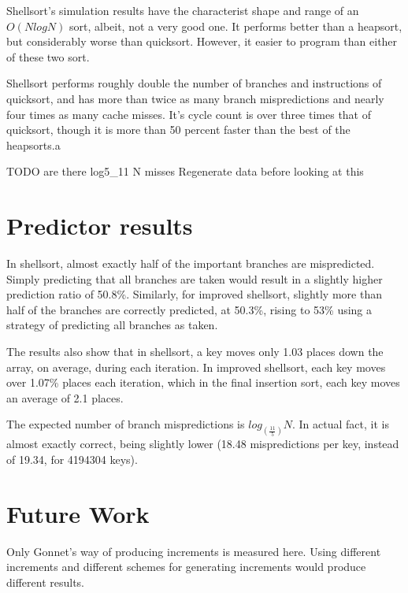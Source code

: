 Shellsort's simulation results have the characterist shape and range of an
$O(NlogN)$ sort, albeit, not a very good one. It performs better than a
heapsort, but considerably worse than quicksort. However, it easier to program
than either of these two sort.

Shellsort performs roughly double the number of branches and instructions of
quicksort, and has more than twice as many branch mispredictions and nearly
four times as many cache misses. It's cycle count is over three times that of
quicksort, though it is more than 50 percent faster than the best of the
heapsorts.a

TODO are there log5_11 N misses
Regenerate data before looking at this

\section{Predictor results}


In shellsort, almost exactly half of the important branches are mispredicted.
Simply predicting that all branches are taken would result in a slightly higher
prediction ratio of 50.8\%. Similarly, for improved shellsort, slightly more
than half of the branches are correctly predicted, at 50.3\%, rising to 53\%
using a strategy of predicting all branches as taken.

The results also show that in shellsort, a key moves only 1.03 places down the
array, on average, during each iteration. In improved shellsort, each key moves
over 1.07\% places each iteration, which in the final insertion sort, each key
moves an average of 2.1 places.

The expected number of branch mispredictions is $log_{(\frac{11}{5})}N$. In
actual fact, it is almost exactly correct, being slightly lower (18.48
mispredictions per key, instead of 19.34, for 4194304 keys).


\section{Future Work}
Only Gonnet's way of producing increments is measured here. Using different
increments and different schemes for generating increments would produce
different results. 

